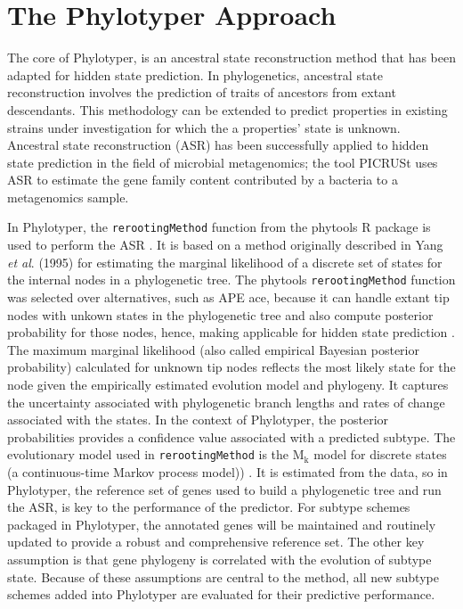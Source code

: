 \documentclass{bioinfo}
\begin{document}
\section{The Phylotyper Approach}

The core of Phylotyper, is an ancestral state reconstruction method that has been adapted for hidden state prediction.
In phylogenetics, ancestral state reconstruction involves the prediction of traits of ancestors from extant descendants.
This methodology can be extended to predict properties in existing strains under investigation for which the a properties' state is unknown.
Ancestral state reconstruction (ASR) has been successfully applied to hidden state prediction in the field of microbial metagenomics; the tool PICRUSt uses ASR to estimate the gene family content contributed by a bacteria to a metagenomics sample.

In Phylotyper, the \texttt{rerootingMethod} function from the phytools R package is used to perform the ASR \citep{Revell2011}.
It is based on a method originally described in Yang \emph{et al}. (1995) for estimating the marginal likelihood of a discrete set of states for the internal nodes in a phylogenetic tree.
The phytools \texttt{rerootingMethod} function was selected over alternatives, such as APE ace, because it can handle extant tip nodes with unkown states in the phylogenetic tree and also compute posterior probability for those nodes, hence, making applicable for hidden state prediction \citep{Revell2011}.
The maximum marginal likelihood (also called empirical Bayesian posterior probability) calculated for unknown tip nodes reflects the most likely state for the node given the empirically estimated evolution model and phylogeny.
It captures the uncertainty associated with phylogenetic branch lengths and rates of change associated with the states.
In the context of Phylotyper, the posterior probabilities provides a confidence value associated with a predicted subtype.
The evolutionary model used in \texttt{rerootingMethod} is the $\text{M}_{\text{k}}$ model for discrete states (a continuous-time Markov process model)) \citep{Revell2011}.  
It is estimated from the data, so in Phylotyper, the reference set of genes used to build a phylogenetic tree and run the ASR, is key to the performance of the predictor.
For subtype schemes packaged in Phylotyper, the annotated genes will be maintained and routinely updated to provide a robust and comprehensive reference set.
The other key assumption is that gene phylogeny is correlated with the evolution of subtype state.
Because of these assumptions are central to the method, all new subtype schemes added into Phylotyper are evaluated for their predictive performance.
\end{document}
